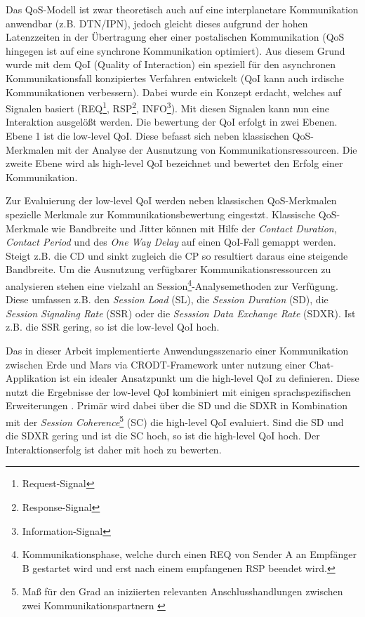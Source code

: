 Das QoS-Modell ist zwar theoretisch auch auf eine interplanetare Kommunikation
anwendbar (z.B. DTN/IPN), jedoch gleicht dieses aufgrund der hohen Latenzzeiten
in der {\"U}bertragung eher einer postalischen Kommunikation (QoS hingegen ist
auf eine synchrone Kommunikation optimiert). Aus diesem Grund wurde mit dem QoI
(Quality of Interaction) ein speziell f{\"u}r den asynchronen
Kommunikationsfall konzipiertes Verfahren entwickelt \cite{Daher2} (QoI kann
auch irdische Kommunikationen verbessern). Dabei wurde ein Konzept erdacht,
welches auf Signalen basiert (REQ\footnote{Request-Signal},
RSP\footnote{Response-Signal}, INFO\footnote{Information-Signal}). Mit diesen
Signalen kann nun eine Interaktion ausgel{\"o}{\ss}t werden. Die bewertung der
QoI erfolgt in zwei Ebenen. Ebene 1 ist die low-level QoI. Diese befasst sich
neben klassischen QoS-Merkmalen mit der Analyse der Ausnutzung von
Kommunikationsressourcen. Die zweite Ebene wird als high-level QoI bezeichnet
und bewertet den Erfolg einer Kommunikation.

Zur Evaluierung der low-level QoI werden neben klassischen QoS-Merkmalen
spezielle Merkmale zur Kommunikationsbewertung eingestzt. Klassische
QoS-Merkmale wie Bandbreite und Jitter k{\"o}nnen mit Hilfe der \textit{Contact
Duration}, \textit{Contact Period} und des \textit{One Way Delay} auf einen QoI-Fall
gemappt werden. Steigt z.B. die CD und sinkt zugleich die CP so resultiert
daraus eine steigende Bandbreite. Um die Ausnutzung verf{\"u}gbarer
Kommunikationsressourcen zu analysieren stehen eine vielzahl an
Session\footnote{Kommunikationsphase, welche durch einen REQ von Sender A an
Empf{\"a}nger B gestartet wird und erst nach einem empfangenen RSP beendet
wird.}-Analysemethoden zur Verf{\"u}gung. Diese umfassen z.B. den
\textit{Session Load} (SL), die \textit{Session Duration} (SD), die
\textit{Session Signaling Rate} (SSR) oder die \textit{Sesssion Data Exchange Rate} (SDXR). Ist
z.B. die SSR gering, so ist die low-level QoI hoch.

Das in dieser Arbeit implementierte Anwendungsszenario einer Kommunikation
zwischen Erde und Mars via CRODT-Framework unter nutzung einer Chat-Applikation
ist ein idealer Ansatzpunkt um die high-level QoI zu definieren. Diese nutzt die
Ergebnisse der low-level QoI kombiniert mit einigen sprachspezifischen
Erweiterungen \cite{Donick}. Prim{\"a}r wird dabei {\"u}ber die SD und die
SDXR in Kombination mit der \textit{Session Coherence}\footnote{Ma{\ss} f{\"u}r
den Grad an iniziierten relevanten Anschlusshandlungen zwischen zwei
Kommunikationspartnern \cite{Donick}} (SC) die high-level QoI evaluiert. Sind
die SD und die SDXR gering und ist die SC hoch, so ist die high-level QoI hoch.
Der Interaktionserfolg ist daher mit hoch zu bewerten.

